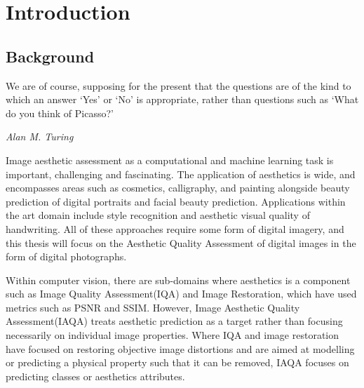 \chapter{Introduction}
\label{chap:Introduction}



\section{Background}
\label{background}
\epigraph{We are of course, supposing for the present that the questions are of the kind to which an answer `Yes' or `No' is appropriate, rather than questions such as `What do you think of Picasso?'\cite{TURING1950}}{\textit{Alan M. Turing
}}

\cite{sal2021, Raiyani2021, Helber2017, Mazzia2020, Baamonde2019}  
Image aesthetic assessment as a computational and machine learning task is important, challenging and fascinating. The application of aesthetics is wide, and encompasses areas such as cosmetics, calligraphy, and painting alongside beauty prediction of digital portraits\cite{Redi2015a} and facial beauty prediction\cite{Gray2010,Eisenthal2006a, Zhang2016}. Applications within the art domain include style recognition\cite{Cho2020, Fernando2021} and aesthetic visual quality of handwriting\cite{Sun2015}. All of these approaches require some form of digital imagery, and this thesis will focus on the Aesthetic Quality Assessment of digital images in the form of digital photographs. \par 

Within computer vision, there are sub-domains where aesthetics is a component such as Image Quality Assessment(IQA)\cite{Gu2020,Seshadrinathan2009,Sheikh2005,Ke2006,Chubarau2021,Reisenhofer2018} and Image Restoration, which have used metrics such as PSNR and SSIM. However, Image Aesthetic Quality Assessment(IAQA) treats aesthetic prediction as a target rather than focusing necessarily on individual image properties. Where IQA and image restoration have focused on restoring objective image distortions and are aimed at modelling or predicting a physical property such that it can be removed, IAQA focuses on predicting classes or aesthetics attributes.

\par
 
